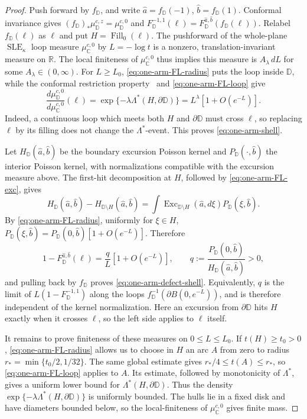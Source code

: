 \documentclass[11pt]{article}
\numberwithin{equation}{section}
\newcommand{\R}{\mathbb{R}}
\newcommand{\D}{\mathbb{D}}
\newcommand{\C}{\mathbb{C}}
\newcommand{\1}{\mathbf{1}}
\DeclareMathOperator{\SLE}{SLE}
\begin{document}
\begin{proof}
Push forward by \(f_\D\), and write
\(\widehat a=f_\D(-1)\), \(\widehat b=f_\D(1)\).  Conformal invariance gives
\((f_\D)_*\mu_\D^{c,z}=\mu_\D^{c,0}\) and
\(F_\D^{-1,1}(\ell)=F_\D^{\widehat a,\widehat b}(f_\D(\ell))\).
Relabel \(f_\D(\ell)\) as \(\ell\) and put
\(H=\operatorname{Fill}_0(\ell)\).  The pushforward of the whole-plane
$\SLE_\kappa$ loop measure \(\mu_\C^{c,0}\) by \(L=-\log t\) is a nonzero,
translation-invariant measure on \(\R\).  
The local finiteness of \(\mu_\C^{c,0}\) thus implies
this measure is \(A_\lambda\,dL\) for some
\(A_\lambda\in(0,\infty)\).  For
\(L\ge L_0\), \eqref{eq:one-arm-FL-radius} puts the loop inside \(\D\),
while the conformal restriction property~\cite[Theorem 5.1]{Zhan2021} and \eqref{eq:one-arm-FL-loop} give
\[
 \frac{d\mu_\D^{c,0}}{d\mu_\C^{c,0}}(\ell)
 =\exp\{-\lambda\Lambda^*(H,\partial\D)\}
 =L^\lambda[1+O(e^{-L})].
\]
Indeed, a continuous loop which meets both
\(H\) and \(\partial\D\) must cross \(\ell\), so replacing
\(\ell\) by its filling does not change the \(\Lambda^*\)-event.
This proves \eqref{eq:one-arm-shell}.

Let \(H_\D(\widehat a,\widehat b)\) be the boundary excursion Poisson
kernel and \(P_\D(\cdot,\widehat b)\) the interior Poisson kernel, with
normalizations compatible with the excursion measure above.  The first-hit
decomposition at \(H\), followed by \eqref{eq:one-arm-FL-exc}, gives
\[
 H_\D(\widehat a,\widehat b)-H_{\D\setminus H}(\widehat a,\widehat b)
 =\int \operatorname{Exc}_{\D\setminus H}(\widehat a,d\xi)
        P_\D(\xi,\widehat b).
\]
By \eqref{eq:one-arm-FL-radius}, uniformly for \(\xi\in H\),
\(P_\D(\xi,\widehat b)=P_\D(0,\widehat b)[1+O(e^{-L})]\).  Therefore
\begin{equation}
 1-F_\D^{\widehat a,\widehat b}(\ell)=\frac qL[1+O(e^{-L})],
 \qquad
 q:=\frac{P_\D(0,\widehat b)}
          {H_\D(\widehat a,\widehat b)}>0,
\end{equation}
and pulling back by \(f_\D\) proves
\eqref{eq:one-arm-defect-shell}.
Equivalently, \(q\) is the limit of \(L(1-F_\D^{-1,1})\) along
the loops \(f_\D^{-1}(\partial B(0,e^{-L}))\), and is therefore independent of the
kernel normalization.
Here an excursion from \(\partial\D\) hits \(H\) exactly
when it crosses \(\ell\), so the left side applies to
\(\ell\) itself.

It remains to prove finiteness of these measures on
\(0\leq L\leq L_0\).  If
\(t(H)\ge t_0>0\), \eqref{eq:one-arm-FL-radius} allows us to choose in
\(H\) an arc \(A\) from zero to radius
\(r_*=\min\{t_0/2,1/32\}\).  The same global estimate gives
\(r_*/4\le t(A)\le r_*\), so \eqref{eq:one-arm-FL-loop} applies to \(A\).
Its estimate, followed by monotonicity of \(\Lambda^*\), gives a uniform
lower bound for \(\Lambda^*(H,\partial\D)\).  Thus the density $\exp\{-\lambda\Lambda^*(H,\partial\D)\}$
is uniformly bounded.  The hulls lie in a fixed disk and
have diameters bounded below, so the local-finiteness of
\(\mu_\C^{c,0}\) gives finite mass.
\end{proof}
\end{document}
